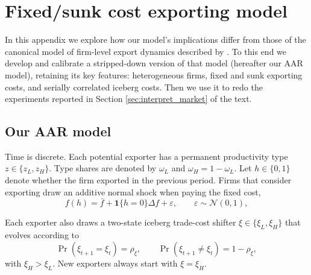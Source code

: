 \documentclass[12pt]{article} \usepackage{amsmath,amssymb,amsthm,geometry,graphicx,setspace,algorithm,algpseudocode,float}
\begin{document}
\section{Fixed/sunk cost exporting model}

\label{app:AAR}
In this appendix we explore how our model's implications differ from those of the canonical model of firm-level export dynamics described by \citet{AlessandriaArkolakisRuhl2020}. To this end we develop and calibrate a stripped-down version of that model (hereafter our AAR model), retaining its key features: heterogeneous firms, fixed and sunk exporting costs, and serially correlated iceberg costs. Then we use it to redo the experiments reported in Section  \ref{sec:interpret_market} of the text.
\par
\subsection{Our AAR model}
Time is discrete. Each potential exporter has a permanent productivity type $z\in\{z_L,z_H\}$.  Type shares are denoted by $\omega_L$ and $\omega_H=1-\omega_L$. Let $h\in\{0,1\}$ denote whether the firm exported in the previous period. Firms that consider exporting draw an additive normal shock when paying the fixed cost,
\[
f(h) = \bar f + \mathbf{1}\{h = 0\} \Delta f + \varepsilon,
\qquad \varepsilon \sim \mathcal{N}(0,1),
\]

Each exporter also draws a two-state iceberg trade-cost shifter
$\xi\in\{\xi_L,\xi_H\}$ that evolves according to
\begin{equation}
\Pr(\xi_{t+1}=\xi_t)=\rho_\xi, \qquad \Pr(\xi_{t+1}\neq \xi_t)=1-\rho_\xi,
\label{eq:xi_transition}
\end{equation}
with $\xi_H>\xi_L$. New exporters always start with $\xi=\xi_H$.
\end{document}
